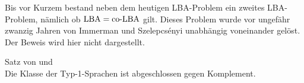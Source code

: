 \begin{Bem}
    Bis vor Kurzem bestand neben dem heutigen LBA-Problem ein zweites
    LBA-Problem, nämlich ob $\text{LBA} = \text{co-LBA}$ gilt.
    Dieses Problem wurde vor ungefähr zwanzig Jahren von
    Immerman und Szelepcsényi unabhängig voneinander gelöst.\\
    Der Beweis wird hier nicht dargestellt.
\end{Bem}

\begin{Satz}{Satz von  und }\\
    Die Klasse der Typ-1-Sprachen ist abgeschlossen gegen Komplement.
\end{Satz}

\pagebreak
